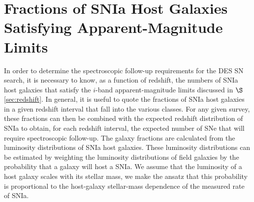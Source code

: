 \documentclass[preprint2]{aastex}    %
\begin{document}
\appendix\label{apdx}
\section{Fractions of SNIa Host Galaxies Satisfying Apparent-Magnitude Limits}\label{apdx:hosts}
In order to determine the spectroscopic follow-up requirements for the
DES SN search, it is necessary to know, as a function of redshift, the
numbers of SNIa host galaxies that satisfy the $i$-band
apparent-magnitude limits discussed in $\S$\ref{sec:redshift}.  
In general, it is useful to quote
the fractions of SNIa host galaxies in a given redshift interval that
fall into the various classes. For any given survey, these
fractions can then be combined with the expected redshift distribution
of SNIa to obtain, for each redshift interval, the expected number of
SNe that will require spectroscopic follow-up. The galaxy fractions
are calculated from the luminosity distributions of SNIa host
galaxies. These luminosity distributions can be estimated by weighting
the luminosity distributions of field galaxies by the probability that
a galaxy will host a SNIa. We assume that the luminosity of a host
galaxy scales with its stellar mass, we make the ansatz that this probability
is proportional to the host-galaxy stellar-mass dependence of the
measured rate of SNIa.
\end{document}
